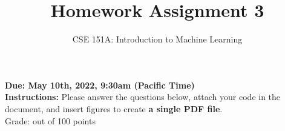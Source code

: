 \documentclass[12pt]{article}%
\begin{document}
\title{Homework Assignment 3}
\author{CSE 151A: Introduction to Machine Learning}
\date{}
\maketitle

\noindent \textbf {Due: May 10th, 2022, 9:30am (Pacific Time)} \\


\noindent \textbf {Instructions:} Please answer the questions below, attach your code in the document, and insert figures to create \textbf{a single PDF file}.\\

\noindent Grade: \underline{\hspace{.8cm}} out of 100 points 
\end{document}
